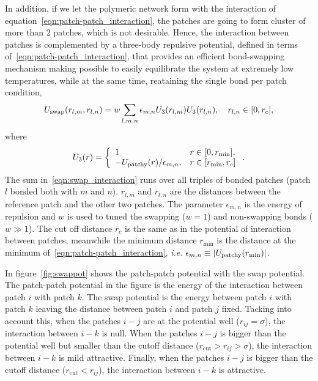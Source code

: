In addition, if we let the polymeric network form with the interaction of equation~\eqref{eqn:patch-patch_interaction}, the patches are going to form cluster of more than 2 patches, which is not desirable.
Hence, the interaction between patches is complemented by a three-body repulsive potential, defined in terms of~\eqref{eqn:patch-patch_interaction}, that provides an efficient bond-swapping mechanism making possible to easily equilibrate the system at extremely low temperatures, while at the same time, reataining the single bond per patch condition\citep{sciortinoThreebodyPotentialSimulating2017},
\begin{gather}
    U_{\mathrm{swap}}(r_{l,m},r_{l,n}) = w\sum_{l,m,n}\epsilon_{m,n}U_3\qty(r_{l,m})U_3\qty(r_{l,n}),\quad r_{l,n}\in\qty[0,r_c],\label{eqn:swap_interaction}
\end{gather}
where
\begin{gather}
    U_{3}\qty(r) = \left\{
        \begin{array}{ll}
            1 & r\in\qty[0,r_{\min}], \\
            -U_{\mathrm{patchy}}\qty(r)/\epsilon_{m,n}, & r\in\qty[r_{\min},r_c]
        \end{array}
        \right.\label{eqn:swapmod_interaction}.
\end{gather}
The sum in~\eqref{eqn:swap_interaction} runs over all triples of bonded patches (patch $l$ bonded both with $m$ and $n$).
$r_{l,m}$ and $r_{l,n}$ are the distances between the reference patch and the other two patches.
The parameter $\epsilon_{m,n}$ is the energy of repulsion and $w$ is used to tuned the swapping ($w=1$) and non-swapping bonds ($w\gg1$). 
The cut off distance $r_c$ is the same as in the potential of interaction between patches, meanwhile the minimum distance $r_{\min}$ is the distance at the minimum of~\eqref{eqn:patch-patch_interaction}, \textit{i.e.} $\epsilon_{m,n}\equiv\abs{U_{\mathrm{patchy}}(r_{\min})}$.

In figure~\ref{fig:swappot} shows the patch-patch potential with the swap potential.
The patch-patch potential in the figure is the energy of the interaction between patch $i$ with patch $k$.
The swap potential is the energy between patch $i$ with patch $k$ leaving the distance between patch $i$ and patch $j$ fixed.
Tacking into account this, when the patches $i-j$ are at the potential well ($r_{ij}=\sigma$), the interaction between $i-k$ is null.
When the patches $i-j$ is bigger than the potential well but smaller than the cutoff distance ($r_{\mathrm{cut}}>r_{ij}>\sigma$), the interaction between $i-k$ is mild attractive.
Finally, when the patches $i-j$ is bigger than the cutoff distance ($r_{\mathrm{cut}}<r_{ij}$), the interaction between $i-k$ is attractive.

